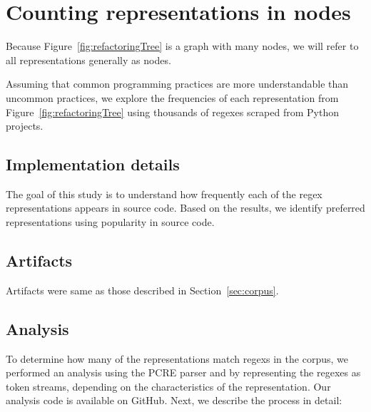 \section{Counting representations in nodes}

Because Figure~\ref{fig:refactoringTree} is a graph with many nodes, we will refer to all representations generally as nodes.




 Assuming that common programming practices are more understandable than uncommon practices, we explore the frequencies of each representation from Figure~\ref{fig:refactoringTree} using thousands of regexes scraped from Python projects.

\subsection{Implementation details}
The goal of this study is to understand how frequently each of the regex representations appears in source code. Based on the results, we identify preferred representations using popularity in source code.

\subsection{Artifacts}
Artifacts were same as those described in Section~\ref{sec:corpus}.


\subsection{Analysis}
To determine how many of the representations match regexs in the corpus, we performed an analysis using the PCRE parser and by representing the regexes as token streams, depending on the characteristics of the representation. Our analysis code is available on GitHub. Next, we describe the process in detail:

